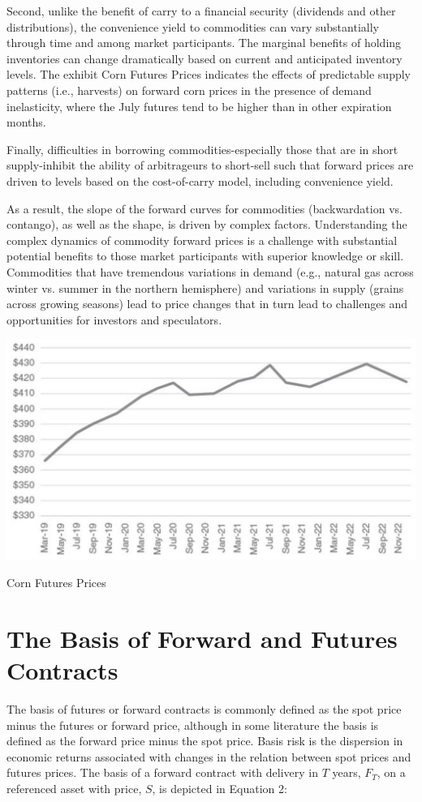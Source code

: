 \documentclass[11pt]{article}
\begin{document}
Second, unlike the benefit of carry to a financial security (dividends and other distributions), the convenience yield to commodities can vary substantially through time and among market participants. The marginal benefits of holding inventories can change dramatically based on current and anticipated inventory levels. The exhibit Corn Futures Prices indicates the effects of predictable supply patterns (i.e., harvests) on forward corn prices in the presence of demand inelasticity, where the July futures tend to be higher than in other expiration months.

Finally, difficulties in borrowing commodities-especially those that are in short supply-inhibit the ability of arbitrageurs to short-sell such that forward prices are driven to levels based on the cost-of-carry model, including convenience yield.

As a result, the slope of the forward curves for commodities (backwardation vs. contango), as well as the shape, is driven by complex factors. Understanding the complex dynamics of commodity forward prices is a challenge with substantial potential benefits to those market participants with superior knowledge or skill. Commodities that have tremendous variations in demand (e.g., natural gas across winter vs. summer in the northern hemisphere) and variations in supply (grains across growing seasons) lead to price changes that in turn lead to challenges and opportunities for investors and speculators.

\begin{center}
\includegraphics[max width=\textwidth]{2024_04_11_00d1b46832d5f98705cdg-4}
\end{center}

Corn Futures Prices

\section*{The Basis of Forward and Futures Contracts}
The basis of futures or forward contracts is commonly defined as the spot price minus the futures or forward price, although in some literature the basis is defined as the forward price minus the spot price. Basis risk is the dispersion in economic returns associated with changes in the relation between spot prices and futures prices. The basis of a forward contract with delivery in $T$ years, $F_{T}$, on a referenced asset with price, $S$, is depicted in Equation 2:
\end{document}
